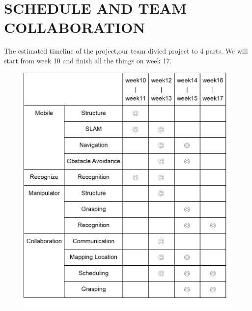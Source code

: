 \documentclass[a4paper, 10pt, conference]{ieeeconf}      %
\begin{document}
\section{SCHEDULE AND TEAM COLLABORATION}
The estimated timeline of the project,our team divied project to 4 parts. We will start from  week 10 and finish all the things on week 17.
\begin{figure}[h]
\includegraphics[width=0.95\columnwidth]{schedule}
\centering
\end{figure}

\addtolength{\textheight}{-12cm}   %
\end{document}
